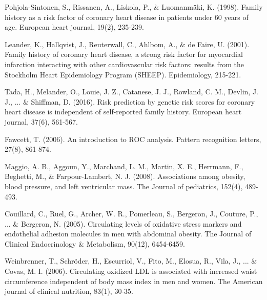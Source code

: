 \documentclass{article}
\begin{document}
{\fontsize{8pt}{10.8pt}\selectfont [18] Pohjola-Sintonen, S., Rissanen, A., Liskola, P., $\&$  Luomanmäki, K. (1998). Family history as a risk factor of coronary heart disease in patients under 60 years of age. European heart journal, 19(2), 235-239.\par}
\vspace{-1em}
{\fontsize{8pt}{10.8pt}\selectfont [19] Leander, K., Hallqvist, J., Reuterwall, C., Ahlbom, A., $\&$  de Faire, U. (2001). Family history of coronary heart disease, a strong risk factor for myocardial infarction interacting with other cardiovascular risk factors: results from the Stockholm Heart Epidemiology Program (SHEEP). Epidemiology, 215-221.\par}
\vspace{-1em}
{\fontsize{8pt}{10.8pt}\selectfont [20] Tada, H., Melander, O., Louie, J. Z., Catanese, J. J., Rowland, C. M., Devlin, J. J., ... $\&$  Shiffman, D. (2016). Risk prediction by genetic risk scores for coronary heart disease is independent of self-reported family history. European heart journal, 37(6), 561-567.\par}
\vspace{-1em}
{\fontsize{8pt}{10.8pt}\selectfont [21] Fawcett, T. (2006). An introduction to ROC analysis. Pattern recognition letters, 27(8), 861-874.\par}
\vspace{-1em}
{\fontsize{8pt}{10.8pt}\selectfont [22] Maggio, A. B., Aggoun, Y., Marchand, L. M., Martin, X. E., Herrmann, F., Beghetti, M., $\&$  Farpour-Lambert, N. J. (2008). Associations among obesity, blood pressure, and left ventricular mass. The Journal of pediatrics, 152(4), 489-493.\par}
\vspace{-1em}
{\fontsize{8pt}{10.8pt}\selectfont [23] Couillard, C., Ruel, G., Archer, W. R., Pomerleau, S., Bergeron, J., Couture, P., ... $\&$  Bergeron, N. (2005). Circulating levels of oxidative stress markers and endothelial adhesion molecules in men with abdominal obesity. The Journal of Clinical Endocrinology $\&$  Metabolism, 90(12), 6454-6459.\par}
\vspace{-1em}
{\fontsize{8pt}{10.8pt}\selectfont [24] Weinbrenner, T., Schröder, H., Escurriol, V., Fito, M., Elosua, R., Vila, J., ... $\&$  Covas, M. I. (2006). Circulating oxidized LDL is associated with increased waist circumference independent of body mass index in men and women. The American journal of clinical nutrition, 83(1), 30-35.\par}
\end{document}
